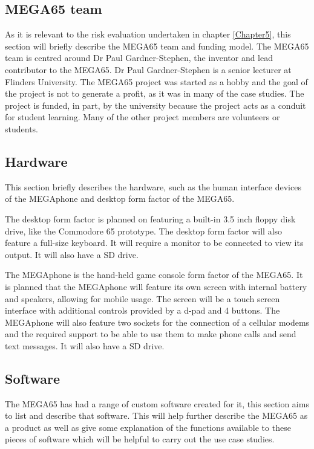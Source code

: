 \subsection{MEGA65 team}
As it is relevant to the risk evaluation undertaken in chapter \ref{Chapter5}, this section will briefly describe the MEGA65 team and funding model. The MEGA65 team is centred around Dr Paul Gardner-Stephen, the inventor and lead contributor to the MEGA65. Dr Paul Gardner-Stephen is a senior lecturer at Flinders University. The MEGA65 project was started as a hobby and the goal of the project is not to generate a profit, as it was in many of the case studies. The project is funded, in part, by the university because the project acts as a conduit for student learning. Many of the other project members are volunteers or students.

\subsection{Hardware}
This section briefly describes the hardware, such as the human interface devices of the MEGAphone and desktop form factor of the MEGA65. 

The desktop form factor is planned on featuring a built-in 3.5 inch floppy disk drive, like the Commodore 65 prototype. The desktop form factor will also feature a full-size keyboard. It will require a monitor to be connected to view its output. It will also have a SD drive.

The MEGAphone is the hand-held game console form factor of the MEGA65. It is planned that the MEGAphone will feature its own screen with internal battery and speakers, allowing for mobile usage. The screen will be a touch screen interface with additional controls provided by a d-pad and 4 buttons. The MEGAphone will also feature two sockets for the connection of a cellular modems and the required support to be able to use them to make phone calls and send text messages. It will also have a SD drive.  

\subsection{Software}
\label{Software}
The MEGA65 has had a range of custom software created for it, this section aims to list and describe that software. This will help further describe the MEGA65 as a product as well as give some explanation of the functions available to these pieces of software which will be helpful to carry out the use case studies.\\

